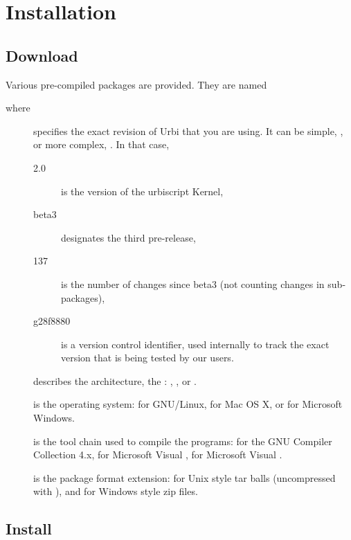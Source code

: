 \chapter{Installation}
\label{sec:installation}

\section{Download}

Various pre-compiled packages are provided.  They are named
\begin{center}
\end{center}
where
\begin{description}
\item[] specifies the exact revision of Urbi that you are
  using.  It can be simple, , or more complex,
  .  In that case,
  \begin{description}
  \item[2.0] is the version of the urbiscript Kernel,
  \item[beta3] designates the third pre-release,
  \item[137] is the number of changes since beta3 (not counting
    changes in sub-packages),
  \item[g28f8880] is a version control identifier, used internally to
    track the exact version that is being tested by our users.
  \end{description}
\item[] describes the architecture, the :
  , , or .
\item[] is the operating system:  for GNU/Linux,
   for Mac OS X, or  for Microsoft Windows.
\item[] is the tool chain used to compile the programs:
   for the GNU Compiler Collection 4.x,  for
  Microsoft Visual ,  for Microsoft Visual
  .
\item[] is the package format extension:  for
  Unix style tar balls (uncompressed with ), and  for Windows style zip files.
\end{description}

\section{Install}


